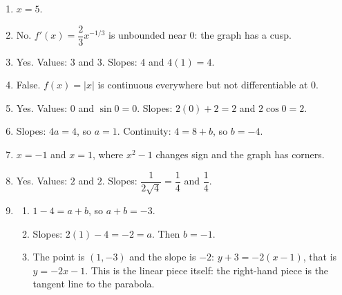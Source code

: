 \documentclass[11pt]{article}
\begin{document}
\newpage
\begin{solbox}
\begin{enumerate}[leftmargin=*,itemsep=4pt]
  \item $x=5$.
  \item No. $f'(x)=\dfrac23x^{-1/3}$ is unbounded near 0: the graph has a cusp.
  \item Yes. Values: $3$ and $3$. Slopes: $4$ and $4(1)=4$.
  \item False. $f(x)=|x|$ is continuous everywhere but not differentiable at 0.
  \item Yes. Values: $0$ and $\sin0=0$. Slopes: $2(0)+2=2$ and $2\cos0=2$.
  \item Slopes: $4a=4$, so $a=1$. Continuity: $4=8+b$, so $b=-4$.
  \item $x=-1$ and $x=1$, where $x^2-1$ changes sign and the graph has corners.
  \item Yes. Values: $2$ and $2$. Slopes: $\dfrac{1}{2\sqrt4}=\dfrac14$ and $\dfrac14$.
  \item \begin{enumerate}[label=(\alph*),leftmargin=*,itemsep=3pt]
    \item $1-4=a+b$, so $a+b=-3$.
    \item Slopes: $2(1)-4=-2=a$. Then $b=-1$.
    \item The point is $(1,-3)$ and the slope is $-2$: $y+3=-2(x-1)$, that is $y=-2x-1$. This is the linear piece itself: the right-hand piece is the tangent line to the parabola.
  \end{enumerate}
\end{enumerate}
\end{solbox}
\end{document}
